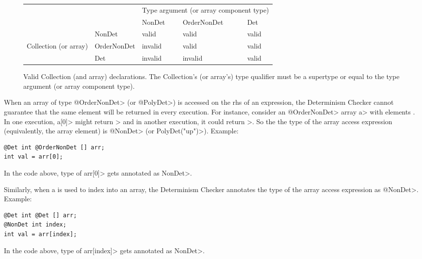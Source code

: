 \begin{figure}
  \centering
  \begin{tabular}{|l|l|l|l|l|}
    \cline{3-5}
    \multicolumn{2}{c|}{~}  &  \multicolumn{3}{c|}{Type argument (or array component type)} \\ \cline{3-5}
    \multicolumn{2}{c|}{~}  & NonDet     & OrderNonDet & Det \\ \hline
              & NonDet      &   valid    &  valid    & valid  \\ \cline{2-5}
Collection (or array)   & OrderNonDet &   invalid  &  valid      & valid  \\ \cline{2-5}
              & Det         &   invalid  &  invalid    & valid      \\ \hline
  \end{tabular}
  \caption{Valid Collection (and array) declarations.  The Collection's (or array's) type qualifier
    must be a supertype or equal to the type argument (or array component type).}
  \label{fig-determinism-collections}
\end{figure}

When an array of type \<@OrderNonDet> (or \<@PolyDet>) is accessed on the rhs of an expression,
the Determinism Checker cannot guarantee that the same element will be returned in every execution. For instance,
consider an \<@OrderNonDet> array \<a> with elements \code{[5,2,8]}. In one execution,
\<a[0]> might return > and in another execution, it could return >.
So the the type of the array access expression (equivalently, the array element) is
\<@NonDet> (or \<PolyDet("up")>). Example:
\begin{Verbatim}
@Det int @OrderNonDet [] arr;
int val = arr[0];
\end{Verbatim}
In the code above, type of \<arr[0]> gets annotated as \<NonDet>.

Similarly, when a  is used to index into an array,
the Determinism Checker annotates the type of the array access expression as \<@NonDet>. Example:
\begin{Verbatim}
@Det int @Det [] arr;
@NonDet int index;
int val = arr[index];
\end{Verbatim}
In the code above, type of \<arr[index]> gets annotated as \<NonDet>.

